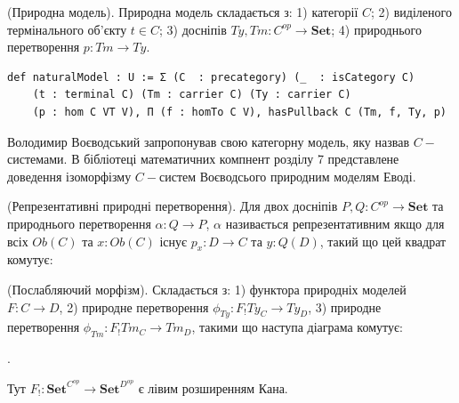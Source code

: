 \begin{definition} (Природна модель). Природна модель складається з:
1) категорії $C$;
2) виділеного термінального об'єкту $t \in C$;
3) досніпів $Ty, Tm : C^{op} \rightarrow \mathbf{Set}$;
4) природнього перетворення $p : Tm \rightarrow Ty$.
\end{definition}

\begin{lstlisting}
def naturalModel : U := Σ (C  : precategory) (_  : isCategory C)
    (t : terminal C) (Tm : carrier C) (Ty : carrier C)
    (p : hom C VT V), Π (f : homTo C V), hasPullback C (Tm, f, Ty, p)
\end{lstlisting}

Володимир Воєводський запропонував свою категорну модель, яку назвав $C-$системами.
В бібліотеці математичних компнент розділу 7 представлене доведення ізоморфізму $C-$систем
Воєводсього природним моделям Еводі.

\begin{definition} (Репрезентативні природні перетворення).
Для двох досніпів $P,Q : C^{op} \rightarrow \textbf{Set}$ та природнього
перетворення $\alpha : Q \rightarrow P$, $\alpha$ називається репрезентативним
якщо для всіх $Ob(C)$ та $x : Ob(C)$ існує $p_x : D \rightarrow C$ та $y : Q(D)$,
такий що цей квадрат комутує:
\begin{center}
\end{center}
\end{definition}

\begin{definition} (Послабляючий морфізм). Складається з:
1) функтора природніх моделей $F: C \rightarrow D$,
2) природне перетворення $\phi_{Ty} : F_! Ty_C \rightarrow Ty_D$,
3) природне перетворення $\phi_{Tm} : F_! Tm_C \rightarrow Tm_D$,
такими що наступа діаграма комутує:
\begin{center}
\end{center}.

Тут $F_! : \textbf{Set}^{C^{op}} \rightarrow \textbf{Set}^{D^{op}}$ є лівим розширенням Кана.
\end{definition}

